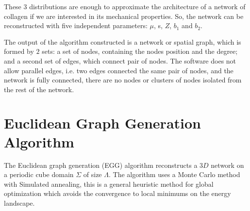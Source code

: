 These $3$ distributions are enough to approximate the architecture of a
network of collagen if we are interested in its mechanical properties.
So, the network can be reconstructed with five
independent parameters:
$\mu$, s, $Z$, $b_1$ and $b_2$.


The output of the algorithm constructed is a network or spatial \gls{graph}, which is formed
by $2$ sets: a set of nodes, containing the nodes
position and the degree; and a second set of edges, which connect pair of
nodes. The software
does not allow parallel edges, i.e. two edges connected the same pair of nodes,
and the network is fully connected, there are no nodes or clusters of nodes
isolated  from the rest of the network.
\section{Euclidean Graph Generation Algorithm}
The Euclidean graph generation (EGG) algorithm reconstructs a $3D$
network on a periodic cube domain $\Sigma$ of size $\Lambda$. The algorithm uses
a Monte Carlo method with Simulated annealing, this is a general heuristic
method for global optimization which avoids the convergence to local minimums on
the energy landscape.

